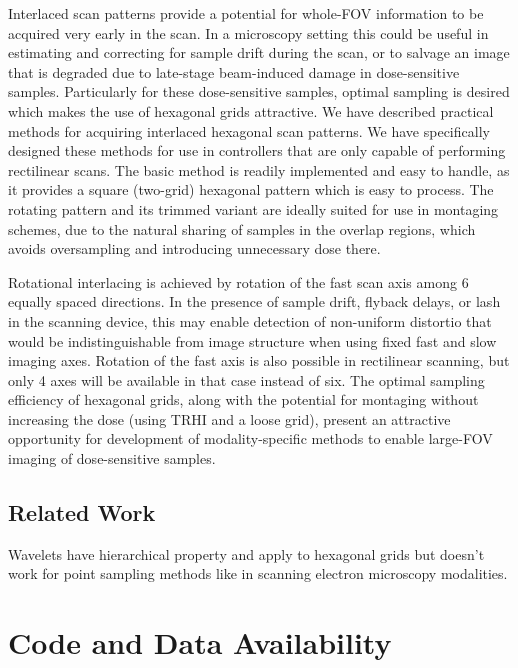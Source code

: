 \documentclass[aip, amsmath, amssymb, nobibnotes, nofootinbib, citeautoscript, reprint, superscriptaddress]{revtex4-1}
\begin{document}
    Interlaced scan patterns provide a potential for whole-FOV information to be acquired very early in the scan.
    In a microscopy setting this could be useful in estimating and correcting for sample drift during the scan, or to salvage an image that is degraded due to late-stage beam-induced damage in dose-sensitive samples.
    Particularly for these dose-sensitive samples, optimal sampling is desired which makes the use of hexagonal grids attractive.
    We have described practical methods for acquiring interlaced hexagonal scan patterns.
    We have specifically designed these methods for use in controllers that are only
    capable of performing rectilinear scans.
    The basic method is readily implemented and easy to handle, as it provides a square (two-grid) hexagonal pattern which is easy to process.
    The rotating pattern and its trimmed variant are ideally suited for use in montaging schemes, due to the natural sharing of samples in the overlap regions, which avoids oversampling and introducing unnecessary dose there.

    Rotational interlacing is achieved by rotation of the fast scan axis among 6 equally spaced directions.
    In the presence of sample drift, flyback delays, or lash in the scanning device, this may enable detection of non-uniform distortio that would be indistinguishable from image structure when using fixed fast and slow imaging axes.
    Rotation of the fast axis is also possible in rectilinear scanning, but only 4 axes will be available in that case instead of six.
    The optimal sampling efficiency of hexagonal grids, along with the potential for montaging without increasing the dose (using TRHI and a loose grid), present an attractive opportunity for development of modality-specific methods to enable large-FOV imaging of dose-sensitive samples.

    \subsection{\label{ssec:wavelets}Related Work}

    Wavelets have hierarchical property and apply to hexagonal grids \cite{hex_compression} but doesn't work for point sampling methods like in scanning electron microscopy modalities.

    \section*{Code and Data Availability}
\end{document}
